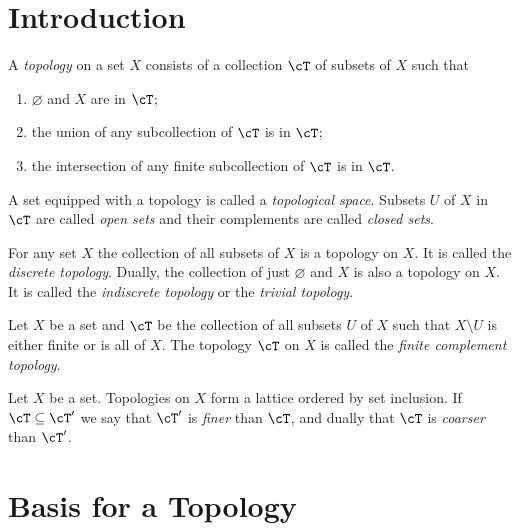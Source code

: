 \documentclass{amsart}
\title{}
\author{Frank Tsai}
\date{\today}
\begin{document}
\maketitle
\tableofcontents

\section{Introduction}
\label{sec:introduction}
\begin{defn}
  A \emph{topology} on a set $X$ consists of a collection $\cT$ of subsets of $X$ such that
  \begin{enumerate}
  \item $\varnothing$ and $X$ are in $\cT$;
  \item the union of any subcollection of $\cT$ is in $\cT$;
  \item the intersection of any finite subcollection of $\cT$ is in $\cT$.
  \end{enumerate}
  A set equipped with a topology is called a \emph{topological space}.
  Subsets $U$ of $X$ in $\cT$ are called \emph{open sets} and their complements are called \emph{closed sets}.
\end{defn}

\begin{eg}
  For any set $X$ the collection of all subsets of $X$ is a topology on $X$.
  It is called the \emph{discrete topology}.
  Dually, the collection of just $\varnothing$ and $X$ is also a topology on $X$.
  It is called the \emph{indiscrete topology} or the \emph{trivial topology}.
\end{eg}

\begin{eg}
  Let $X$ be a set and $\cT$ be the collection of all subsets $U$ of $X$ such that $X \setminus U$ is either finite or is all of $X$.
  The topology $\cT$ on $X$ is called the \emph{finite complement topology}.
\end{eg}

\begin{defn}
  Let $X$ be a set.
  Topologies on $X$ form a lattice ordered by set inclusion.
  If $\cT \subseteq \cT'$ we say that $\cT'$ is \emph{finer} than $\cT$, and dually that $\cT$ is \emph{coarser} than $\cT'$.
\end{defn}

\section{Basis for a Topology}
\label{sec:basis-for-a-topology}
\end{document}
